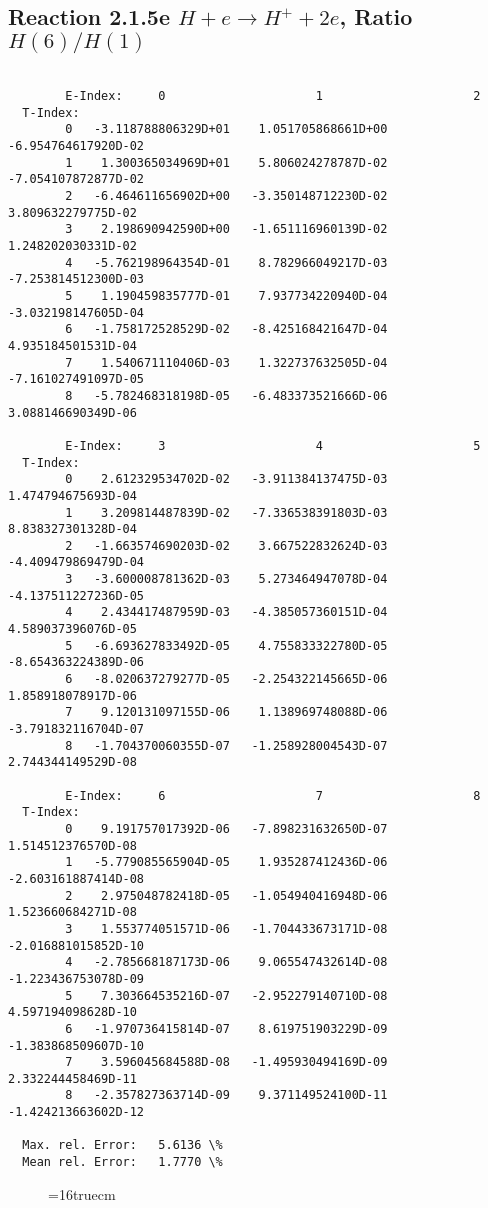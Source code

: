 \documentclass[12pt,dvipdfmx]{article}
\begin{document}
\newpage
\subsection{
Reaction 2.1.5e  $H + e \rightarrow H^+ + 2e$, Ratio $H(6)/H(1)$
}


\begin{small}\begin{verbatim}

        E-Index:     0                     1                     2
  T-Index:
        0   -3.118788806329D+01    1.051705868661D+00   -6.954764617920D-02
        1    1.300365034969D+01    5.806024278787D-02   -7.054107872877D-02
        2   -6.464611656902D+00   -3.350148712230D-02    3.809632279775D-02
        3    2.198690942590D+00   -1.651116960139D-02    1.248202030331D-02
        4   -5.762198964354D-01    8.782966049217D-03   -7.253814512300D-03
        5    1.190459835777D-01    7.937734220940D-04   -3.032198147605D-04
        6   -1.758172528529D-02   -8.425168421647D-04    4.935184501531D-04
        7    1.540671110406D-03    1.322737632505D-04   -7.161027491097D-05
        8   -5.782468318198D-05   -6.483373521666D-06    3.088146690349D-06

        E-Index:     3                     4                     5
  T-Index:
        0    2.612329534702D-02   -3.911384137475D-03    1.474794675693D-04
        1    3.209814487839D-02   -7.336538391803D-03    8.838327301328D-04
        2   -1.663574690203D-02    3.667522832624D-03   -4.409479869479D-04
        3   -3.600008781362D-03    5.273464947078D-04   -4.137511227236D-05
        4    2.434417487959D-03   -4.385057360151D-04    4.589037396076D-05
        5   -6.693627833492D-05    4.755833322780D-05   -8.654363224389D-06
        6   -8.020637279277D-05   -2.254322145665D-06    1.858918078917D-06
        7    9.120131097155D-06    1.138969748088D-06   -3.791832116704D-07
        8   -1.704370060355D-07   -1.258928004543D-07    2.744344149529D-08

        E-Index:     6                     7                     8
  T-Index:
        0    9.191757017392D-06   -7.898231632650D-07    1.514512376570D-08
        1   -5.779085565904D-05    1.935287412436D-06   -2.603161887414D-08
        2    2.975048782418D-05   -1.054940416948D-06    1.523660684271D-08
        3    1.553774051571D-06   -1.704433673171D-08   -2.016881015852D-10
        4   -2.785668187173D-06    9.065547432614D-08   -1.223436753078D-09
        5    7.303664535216D-07   -2.952279140710D-08    4.597194098628D-10
        6   -1.970736415814D-07    8.619751903229D-09   -1.383868509607D-10
        7    3.596045684588D-08   -1.495930494169D-09    2.332244458469D-11
        8   -2.357827363714D-09    9.371149524100D-11   -1.424213663602D-12

  Max. rel. Error:   5.6136 \%
  Mean rel. Error:   1.7770 \%

\end{verbatim}\end{small}
\begin{figure} \label{2.1.5e}
\epsfxsize=16truecm
\end{figure}
\end{document}
